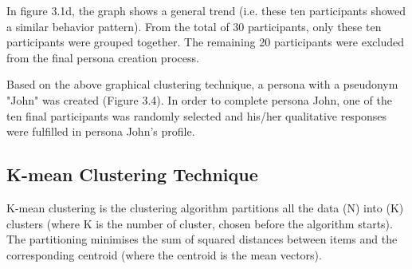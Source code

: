 In figure 3.1d, the graph shows a general trend (i.e. these ten participants showed a similar behavior pattern). From the total of 30 participants, only these ten participants were grouped together. The remaining 20 participants were excluded from the final persona creation process. 

Based on the above graphical clustering technique, a persona with a pseudonym "John" was created (Figure 3.4). In order to complete persona John, one of the ten final participants was randomly selected and his/her qualitative responses were fulfilled in persona John's profile.


\subsection{K-mean Clustering Technique} 

K-mean clustering is the clustering algorithm partitions all the data (N) into (K) clusters (where K is the number of cluster, chosen before the algorithm starts). The partitioning minimises the sum of squared distances between items and the corresponding centroid (where the centroid is the mean vectors). 


